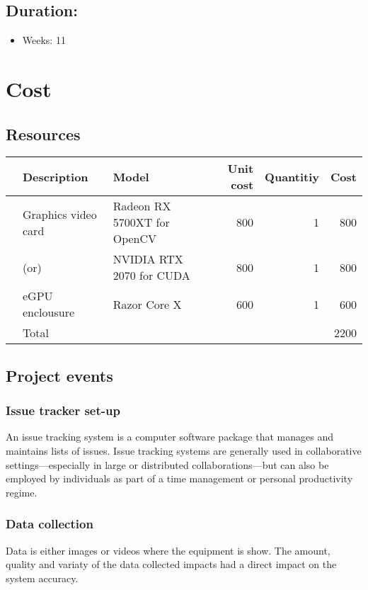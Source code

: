 \documentclass{article}
\begin{document}
\subsection{Duration:}
\label{sec:orga853f5f}
\begin{itemize}
\item Weeks: 11
\end{itemize}
\section{Cost}
\label{sec:org57a8bea}
\subsection{Resources}
\label{sec:org16aa4a7}
\begin{center}
\begin{tabular}{lllrrr}
 & Description & Model & Unit cost & Quantitiy & Cost\\
\hline
 & Graphics video card & Radeon RX 5700XT for OpenCV & 800 & 1 & 800\\
 & (or) & NVIDIA RTX 2070 for CUDA & 800 & 1 & 800\\
 & eGPU enclousure & Razor Core X & 600 & 1 & 600\\
\hline
 & Total &  &  &  & 2200\\
\end{tabular}
\end{center}

\subsection{Project events}
\label{sec:org7b8193d}
\subsubsection{Issue tracker set-up}
\label{sec:orgde53d0b}
An issue tracking system is a computer software package that manages and maintains lists of issues.
Issue tracking systems are generally used in collaborative settings—especially in large or distributed collaborations—but can also be employed by individuals as part of a time management or personal productivity regime.
\subsubsection{Data collection}
\label{sec:org3a63c58}
Data is either images or videos where the equipment is show.
The amount, quality and variaty of the data collected impacts had a direct impact on the system accuracy. 
\end{document}

